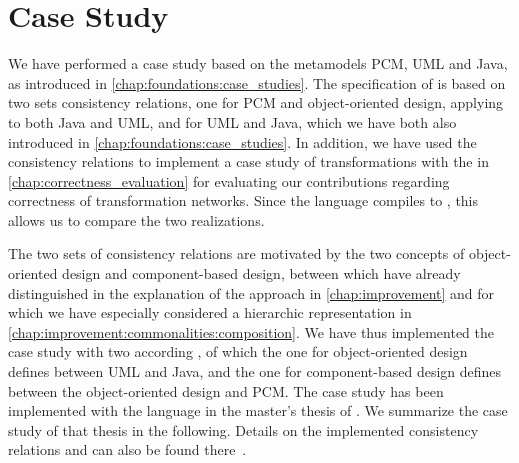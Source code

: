 \section{Case Study}

We have performed a case study based on the metamodels \gls{PCM}, \gls{UML} and Java, as introduced in \autoref{chap:foundations:case_studies}.
The specification of \commonalities is based on two sets consistency relations, one for \gls{PCM} and object-oriented design, applying to both Java and \gls{UML}, and for \gls{UML} and Java, which we have both also introduced in \autoref{chap:foundations:case_studies}.
In addition, we have used the consistency relations to implement a case study of transformations with the \reactionslanguage in \autoref{chap:correctness_evaluation} for evaluating our contributions regarding correctness of transformation networks.
Since the \commonalities language compiles to \reactions, this allows us to compare the two realizations.

The two sets of consistency relations are motivated by the two concepts of object-oriented design and component-based design, between which have already distinguished in the explanation of the \commonalities approach in \autoref{chap:improvement} and for which we have especially considered a hierarchic representation in \autoref{chap:improvement:commonalities:composition}.
We have thus implemented the case study with two according \conceptmetamodels, of which the one for object-oriented design defines \commonalities between \gls{UML} and Java, and the one for component-based design defines \commonalities between the object-oriented design \conceptmetamodel and \gls{PCM}.
The case study has been implemented with the \commonalities language in the master's thesis of \textcite{hennig2020ma}.
We summarize the case study of that thesis in the following.
Details on the implemented consistency relations and \commonalities can also be found there~.


